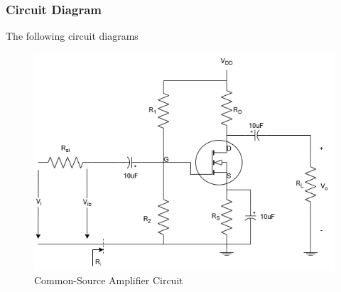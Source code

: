     \subsubsection{Circuit Diagram}
        The following circuit diagrams 
        \begin{figure}[H]
            \centering
                \includegraphics[width=1\linewidth]{Experiment_09/Circuit/Lab9.drawio.png}
                \caption{Common-Source Amplifier Circuit}
                \label{cir:9}
        \end{figure}


